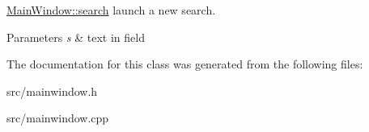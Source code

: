\hyperlink{classMainWindow_a62fcad69e9d32b98f3ac40a5a1d0f398}{Main\+Window\+::search} launch a new search. 


\begin{DoxyParams}{Parameters}
{\em s} & text in field \\
\hline
\end{DoxyParams}


The documentation for this class was generated from the following files\+:\begin{DoxyCompactItemize}
\item 
src/mainwindow.\+h\item 
src/mainwindow.\+cpp\end{DoxyCompactItemize}
